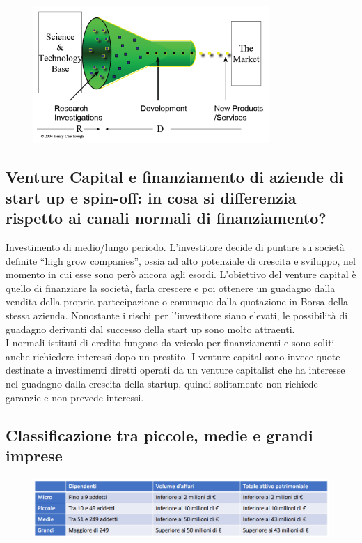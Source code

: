 \documentclass[12pt]{article}
\begin{document}
\FloatBarrier
\begin{figure}[!htb]
    \centering
    \includegraphics[width=0.8\textwidth]{images/closed.png}
\end{figure}
\FloatBarrier
\newpage
\subsection{Venture Capital e finanziamento di aziende di start up e spin-off: in cosa si differenzia rispetto ai canali normali di finanziamento?}
Investimento di medio/lungo periodo. L’investitore decide di puntare su società definite “high grow companies”, ossia ad alto potenziale di crescita e sviluppo, nel momento in cui esse sono però ancora agli esordi.
L’obiettivo del venture capital è quello di finanziare la società, farla crescere e poi ottenere un guadagno dalla vendita della propria partecipazione o comunque dalla quotazione in Borsa della stessa azienda. Nonostante i rischi per l’investitore siano elevati, le possibilità di guadagno derivanti dal successo della start up sono molto attraenti.\\
I normali istituti di credito fungono da veicolo per finanziamenti e sono soliti anche richiedere interessi dopo un prestito. I venture capital sono invece quote destinate a investimenti diretti operati da un venture capitalist che ha interesse nel guadagno dalla crescita della startup, quindi solitamente non richiede garanzie e non prevede interessi.
\newpage
\subsection{Classificazione tra piccole, medie e grandi imprese}
\FloatBarrier
\begin{figure}[!htb]
    \centering
    \includegraphics[width=1\textwidth]{images/pmi.png}
\end{figure}
\FloatBarrier
\newpage
\end{document}
